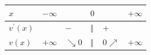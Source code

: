 \documentclass[border=.4pt]{standalone}
\begin{document}
\color{ink}\begin{tabular}{|>{\centering\arraybackslash}m{1.7cm}|>{\centering\arraybackslash}m{1.25cm}|>{\centering\arraybackslash}m{1.25cm}|>{\centering\arraybackslash}m{1.25cm}|>{\centering\arraybackslash}m{1.25cm}|>{\centering\arraybackslash}m{1.25cm}|}\hline
\cellcolor{head}$x$ & \cellcolor{head}$-\infty$ & \cellcolor{head} & \cellcolor{head}$0$ & \cellcolor{head} & \cellcolor{head}$+\infty$ \\ \hline
\cellcolor{head}$v^{\prime}(x)$ &  & $-$ & $\Vert$ & $+$ &  \\ \hline
\cellcolor{head}$v(x)$ & $+\infty$ & \color{focus}\large $\searrow 0$ & $\Vert$ & \color{focus}\large $0 \nearrow$ & $+\infty$ \\ \hline\end{tabular}
\end{document}

